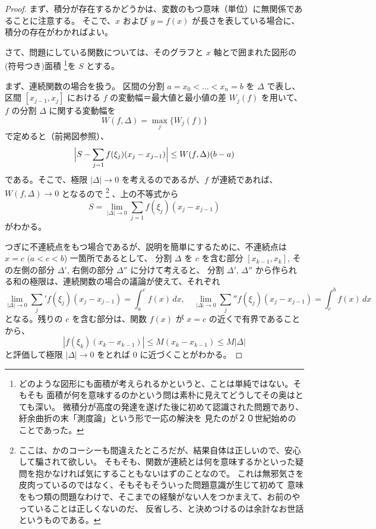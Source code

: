 \documentclass[a4paper]{jsarticle}
\theoremstyle{definition}
\theoremstyle{remark}
\begin{document}
\begin{proof}
まず、積分が存在するかどうかは、変数のもつ意味（単位）に無関係であることに注意する。
そこで、$x$ および $y = f(x)$ が長さを表している場合に、積分の存在がわかればよい。

さて、問題にしている関数については、そのグラフと $x$ 軸とで囲まれた図形の(符号つき)面積
\footnote{
どのような図形にも面積が考えられるかというと、ことは単純ではない。そもそも
面積が何を意味するのかという問は素朴に見えてどうしてその奥はとても深い。
微積分が高度の発達を遂げた後に初めて認識された問題であり、紆余曲折の末「測度論」という形で一応の解決を
見たのが２０世紀始めのことであった。
}を $S$ とする。

まず、連続関数の場合を扱う。
区間の分割 $a= x_0 < \dots < x_n = b$ を $\Delta$ で表し、
区間 $[x_{j-1},x_j]$ における $f$ の変動幅＝最大値と最小値の差 $W_j(f)$ を用いて、
$f$ の分割 $\Delta$ に関する変動幅を
\[
W(f,\Delta) = \max_{j} \{ W_j(f)\}
\]
で定めると（前掲図参照）、
\[
\Bigl| 
S - \sum_{j=1} f(\xi_j)(x_j - x_{j-1}) 
\Bigr| 
\leq W(f,\Delta) (b-a)
\]
である。そこで、極限 $| \Delta| \to 0$ を考えるのであるが、$f$ が連続であれば、
$W(f,\Delta) \to 0$ となるので
\footnote{
ここは、かのコーシーも間違えたところだが、結果自体は正しいので、安心して騙されて欲しい。
そもそも、関数が連続とは何を意味するかといった疑問を抱かなければ気にすることもないはずのことなので。
これは無邪気さを皮肉っているのではなく、そもそもそういった問題意識が生じて初めて
意味をもつ類の問題なわけで、そこまでの経験がない人をつかまえて、お前のやっていることは正しくないのだ、
反省しろ、と決めつけるのは余計なお世話というものである。
}
、上の不等式から
\[
S = \lim_{|\Delta| \to 0} \sum_{j=1} f(\xi_j)(x_j - x_{j-1}) 
\]
がわかる。

つぎに不連続点をもつ場合であるが、説明を簡単にするために、不連続点は $x=c$ $(a< c < b$) 一箇所であるとして、
分割 $\Delta$ を $c$ を含む部分 $[x_{k-1},x_k]$, その左側の部分 $\Delta'$, 右側の部分 $\Delta''$ に分けて考えると、
分割 $\Delta'$, $\Delta''$ から作られる和の極限は、連続関数の場合の議論が使えて、それぞれ
\[
\lim_{|\Delta| \to 0} \sum_j' f(\xi_j)(x_j - x_{j-1}) = \int_a^c f(x)\, dx, 
\quad 
\lim_{|\Delta| \to 0} \sum_j'' f(\xi_j)(x_j - x_{j-1}) = \int_c^b f(x)\, dx
\]
となる。残りの $c$ を含む部分は、関数 $f(x)$ が $x=c$ の近くで有界であることから、
\[
|f(\xi_k)(x_k - x_{k-1})| \leq M(x_k - x_{k-1}) \leq M | \Delta| 
\]
と評価して極限 $|\Delta| \to 0$ をとれば $0$ に近づくことがわかる。


\end{proof}
\end{document}
